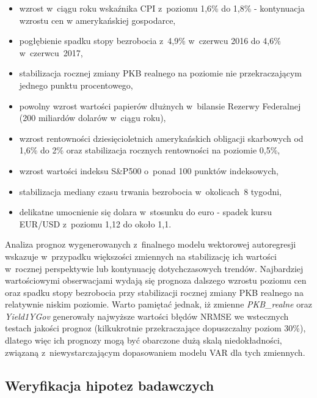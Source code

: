\vspace{-0.15cm}
\begin{itemize}
\setlength\itemsep{0.05cm}
\item wzrost w~ciągu roku wskaźnika \acs{CPI} z~poziomu 1,6\% do 1,8\% - kontynuacja wzrostu cen w amerykańskiej gospodarce,
\item pogłębienie spadku stopy bezrobocia z~4,9\% w~czerwcu 2016 do 4,6\% w~czerwcu~2017,
\item stabilizacja rocznej zmiany \acs{PKB} realnego na poziomie nie przekraczającym jednego punktu procentowego,
\item powolny wzrost wartości papierów dłużnych w~bilansie Rezerwy Federalnej (200 miliardów dolarów w~ciągu roku),
\item wzrost rentowności dziesięcioletnich amerykańskich obligacji skarbowych od 1,6\% do 2\% oraz stabilizacja rocznych rentowności na poziomie 0,5\%,
\item wzrost wartości indeksu S\&P500 o~ponad 100 punktów indeksowych,
\item stabilizacja mediany czasu trwania bezrobocia w~okolicach~8 tygodni,
\item delikatne umocnienie się dolara w~stosunku do euro - spadek kursu EUR/USD z~poziomu 1,12 do około 1,1. 
\end{itemize}

\noindent Analiza prognoz wygenerowanych z~finalnego modelu wektorowej autoregresji wskazuje w~przypadku większości zmiennych na stabilizację ich wartości w~rocznej perspektywie lub kontynuację dotychczasowych trendów. Najbardziej wartościowymi obserwacjami wydają się prognoza dalszego wzrostu poziomu cen oraz spadku stopy bezrobocia przy stabilizacji rocznej zmiany \acs{PKB} realnego na relatywnie niskim poziomie. Warto pamiętać jednak, iż zmienne \textit{PKB_realne} oraz \textit{Yield1YGov} generowały najwyższe wartości błędów \acs{NRMSE} we wstecznych testach jakości prognoz (kilkukrotnie przekraczające dopuszczalny poziom 30\%), dlatego więc ich prognozy mogą być obarczone dużą skalą niedokładności, związaną z~niewystarczającym dopasowaniem modelu \acs{VAR} dla tych zmiennych. 

\subsection*{\normalsize{Weryfikacja hipotez badawczych}}

